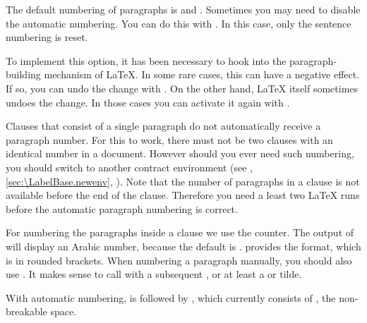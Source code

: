 \begin{Declaration}
\end{Declaration}
The default numbering of paragraphs is  and
. Sometimes you may need to disable the automatic
numbering. You can do this with %
%
. In this case, only the sentence
numbering is reset.

To implement this option, it has been necessary to hook into the
paragraph-building mechanism of \LaTeX. In some rare cases, this can have a
negative effect. If so, you can undo the change with
%
%
. On the other hand, \LaTeX{}
itself sometimes undoes the change. In those cases you can activate it again
with %
%
.

Clauses that consist of a single paragraph do not automatically receive a
paragraph number. For this to work, there must not be two clauses with an
identical number in a document. However should you ever need such numbering,
you should switch to another contract environment (see
,
\autoref{sec:\LabelBase.newenv},
).
Note that the number of paragraphs in a clause is not
available before the end of the clause. Therefore you need a least two
\LaTeX{} runs before the automatic paragraph numbering is correct.%
\EndIndexGroup


\begin{Declaration}
\end{Declaration}%
For numbering the paragraphs inside a clause we use the  counter.
The output of  will display an Arabic number, because the
default is .  provides the
format, which is  in rounded brackets. When numbering a
paragraph manually, you should also use . It makes sense to
call  with a subsequent , or at
least a  or tilde.

With automatic numbering, 
is followed by , which currently consists of
, the non-breakable space.

